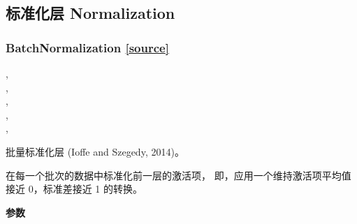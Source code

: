 \subsection{标准化层 Normalization}
    
\subsubsection{BatchNormalization {\href{https://github.com/keras-team/keras/blob/master/keras/layers/normalization.py\#L16}{{[}source{]}}}}

\begin{Shaded}
\begin{Highlighting}[]
\OperatorTok{=-}\OperatorTok{=}\OperatorTok{=}, \\
\hspace{3cm}\OperatorTok{=}\OperatorTok{=}\OperatorTok{=}, \\
\hspace{3cm}\OperatorTok{=}\OperatorTok{=}, \\
\hspace{3cm}\OperatorTok{=}\OperatorTok{=}, \\
\hspace{3cm}\OperatorTok{=}\OperatorTok{=}, \\
\hspace{3cm}\OperatorTok{=}\NormalTok{)}
\end{Highlighting}
\end{Shaded}

批量标准化层 (Ioffe and Szegedy, 2014)。

在每一个批次的数据中标准化前一层的激活项，
即，应用一个维持激活项平均值接近 0，标准差接近 1 的转换。

\textbf{参数}


